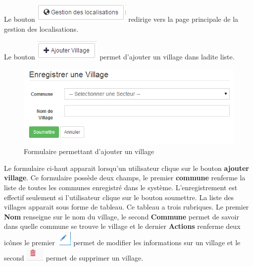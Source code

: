 \documentclass[12pt,a4paper]{report}
\begin{document}
Le bouton \includegraphics[scale=0.7]{pic/GestionEmplacement.png} redirige vers la page principale de la gestion des localisations.

Le bouton \includegraphics[scale=0.7]{pic/AddVillage.png} permet d'ajouter un village dans ladite liste.

\begin{figure}[h]
\begin{center}
\includegraphics[width=14cm]{pic/FormAddVillage.png}
\end{center}
\caption{Formulaire permettant d'ajouter un village}
\label{Formulaire permettant d'ajouter un village}
\end{figure}

Le formulaire ci-haut apparait lorsqu'un utilisateur clique sur le bouton \textbf{ajouter village}. Ce formulaire possède deux champs, le premier \textbf{commune} renferme la liste de toutes les communes enregistré dans le système. 
L'enregistrement est effectif seulement si l'utilisateur clique sur le bouton soumettre. La liste des villages apparait sous forme de tableau. Ce tableau a trois rubriques. Le premier \textbf{Nom} renseigne sur le nom du village, le second \textbf{Commune} permet de savoir dans quelle commune se trouve le village et le dernier \textbf{Actions} renferme deux icônes le premier \includegraphics[scale=0.7]{pic/EditUser.png}  permet de modifier les informations sur un village et le second \includegraphics[scale=0.7]{pic/DeleteWRed.png}  permet de supprimer un village.
\end{document}
